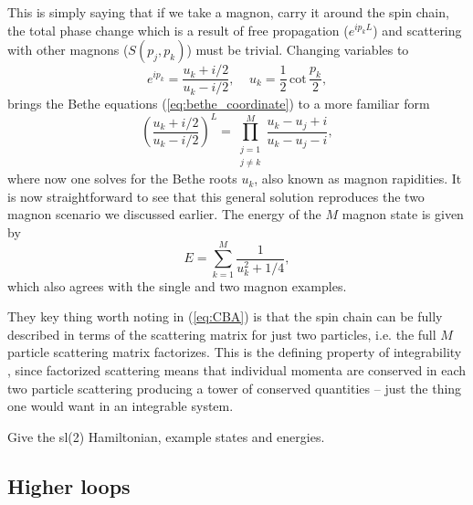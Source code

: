 This is simply saying that if we take a magnon, carry it around the spin chain, the total phase change which is a result of free propagation ($e^{ip_k L}$) and scattering with other magnons ($S(p_j,p_k)$) must be trivial.  Changing variables to
\begin{equation}
	e^{ip_k} = \frac{u_k + i/2}{u_k - i/2}, \;\;\;\; u_k = \frac{1}{2} \, \mathrm{cot} \, \frac{p_k}{2},
\end{equation}
brings the Bethe equations (\ref{eq:bethe_coordinate}) to a more familiar form
\begin{equation}
	\left( \frac{u_k + i/2}{u_k - i/2} \right)^L = \prod_{\substack{j=1 \\ j \neq k}}^M \frac{u_k - u_j + i}{u_k - u_j - i},
\end{equation}
where now one solves for the Bethe roots $u_k$, also known as magnon rapidities. It is now straightforward to see that this general solution reproduces the two magnon scenario we discussed earlier. The energy of the $M$ magnon state is given by
\begin{equation}
	E = \sum_{k=1}^M \frac{1}{u_k^2 + 1/4},
\end{equation}
 which also agrees with the single and two magnon examples. 
 
They key thing worth noting in (\ref{eq:CBA}) is that the spin chain can be fully described in terms of the scattering matrix for just two particles, i.e. the full $M$ particle scattering matrix factorizes. This is the defining property of integrability \cite{dorey}, since factorized scattering means that individual momenta are conserved in each two particle scattering producing a tower of conserved quantities -- just the thing one would want in an integrable system. 
 
 
Give the sl(2) Hamiltonian, example states and energies.

\subsection{Higher loops}


